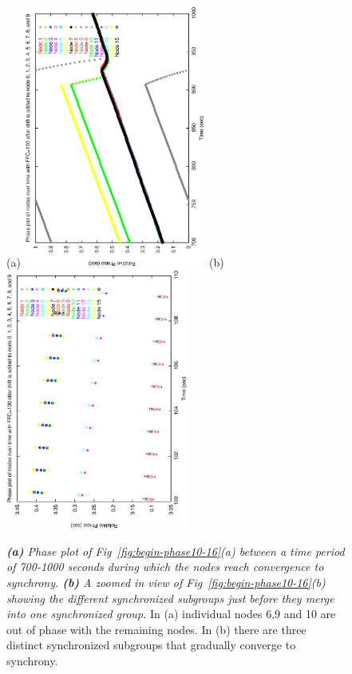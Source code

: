 \begin{figure}
\centerline{%
(a)
\includegraphics[width=6cm,angle=270]{figures/10-links-loss-0.1-run-10-phase.ps}
(b)
\includegraphics[width=6cm,angle=270]{figures/16-links-loss-0.1-run-10-phase.ps}
}
\caption{ {\it {\bf (a)} Phase plot of Fig~\ref{fig:begin-phase10-16}(a) between a time period of 700-1000 seconds during which the nodes reach convergence to synchrony.  {\bf (b)} A zoomed in view of Fig~\ref{fig:begin-phase10-16}(b) showing
the different synchronized subgroups just before they merge into one synchronized group.}
In (a) individual nodes 6,9 and 10 are out of phase with the remaining nodes. In (b) there are three distinct synchronized subgroups that gradually converge to synchrony.}
\label{fig:phase10-16}
\end{figure}


